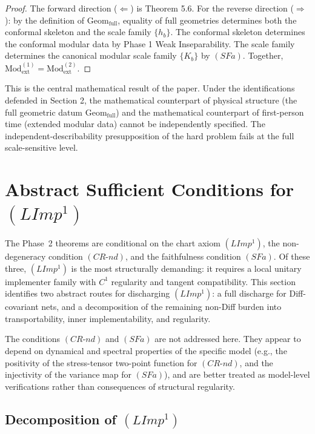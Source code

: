 \documentclass[12pt]{article}
\theoremstyle{definition}
\theoremstyle{remark}
\begin{document}
\begin{proof}
The forward direction (\(\Leftarrow\)) is Theorem 5.6.
For the reverse direction (\(\Rightarrow\)): by the definition of
\(\mathrm{Geom}_{\mathrm{full}}\), equality of full geometries
determines both the conformal skeleton and the scale family \(\{h_b\}\).
The conformal skeleton determines the conformal modular data by Phase 1
Weak Inseparability. The scale family determines the canonical modular
scale family \(\{K_b\}\) by \((SFa)\). Together,
\(\mathrm{Mod}_{\mathrm{ext}}^{(1)} = \mathrm{Mod}_{\mathrm{ext}}^{(2)}\).
\end{proof}

This is the central mathematical result of the paper. Under the
identifications defended in Section 2, the mathematical counterpart of
physical structure (the full geometric datum
\(\mathrm{Geom}_{\mathrm{full}}\)) and the mathematical counterpart of
first-person time (extended modular data) cannot be independently
specified. The independent-describability presupposition of the hard
problem fails at the full scale-sensitive level.

\section{Abstract Sufficient Conditions for \texorpdfstring{$(LImp^1)$}{(LImp1)}}\label{sufficient-conditions-limp}

The Phase~2 theorems are conditional on the chart axiom $(LImp^1)$, the non-degeneracy condition $(CR\text{-}nd)$, and the faithfulness condition $(SFa)$. Of these three, $(LImp^1)$ is the most structurally demanding: it requires a local unitary implementer family with $C^1$ regularity and tangent compatibility. This section identifies two abstract routes for discharging $(LImp^1)$: a full discharge for Diff-covariant nets, and a decomposition of the remaining non-Diff burden into transportability, inner implementability, and regularity.

The conditions $(CR\text{-}nd)$ and $(SFa)$ are not addressed here. They appear to depend on dynamical and spectral properties of the specific model (e.g., the positivity of the stress-tensor two-point function for $(CR\text{-}nd)$, and the injectivity of the variance map for $(SFa)$), and are better treated as model-level verifications rather than consequences of structural regularity.

\subsection{Decomposition of \texorpdfstring{$(LImp^1)$}{(LImp1)}}\label{decomposition-limp}
\end{document}
